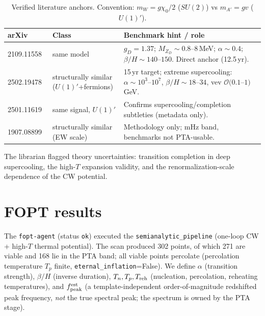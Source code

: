 \documentclass[11pt]{article}
\newcommand{\chizero}{\chi_0}
\begin{document}
\begin{table}[h]
\centering
\small
\begin{tabular}{@{}lp{4.0cm}p{6.4cm}@{}}
\toprule
arXiv & Class & Benchmark hint / role \\
\midrule
2109.11558~\cite{Borah2021} & same model & $g_D=1.37$; $M_{Z_D}\sim0.8$--$8$\,MeV; $\alpha\sim0.4$; $\beta/H\sim140$--$150$. Direct anchor (12.5\,yr). \\
2502.19478~\cite{Balan2025} & structurally similar ($U(1)'$+fermions) & 15\,yr target; extreme supercooling: $\alpha\sim10^3$--$10^7$, $\beta/H\sim18$--$34$, vev $\mathcal{O}(0.1$--$1)$\,GeV. \\
2501.11619~\cite{Goncalves2025} & same signal, $U(1)'$ & Confirms supercooling/completion subtleties (metadata only). \\
1907.08899~\cite{Mohamadnejad2020} & structurally similar (EW scale) & Methodology only; mHz band, benchmarks not PTA-usable. \\
\bottomrule
\end{tabular}
\caption{Verified literature anchors. Convention: $m_W=g\chizero/2$ ($SU(2)$) vs $m_{A'}=gv$
($U(1)'$).}
\label{tab:lit}
\end{table}

\noindent The librarian flagged theory uncertainties: transition completion in deep supercooling, the
high-$T$ expansion validity, and the renormalization-scale dependence of the CW potential.

\section{FOPT results}
\label{sec:fopt}
The \texttt{fopt-agent} (status \texttt{ok}) executed the \texttt{semianalytic\_pipeline} (one-loop CW +
high-$T$ thermal potential). The scan produced 302 points, of which 271 are viable and 168 lie in the
PTA band; all viable points percolate (percolation temperature $T_p$ finite,
\texttt{eternal\_inflation}=False). We define $\alpha$ (transition strength), $\beta/H$ (inverse
duration), $T_n,T_p,T_{\rm reh}$ (nucleation, percolation, reheating temperatures), and $f_{\rm
peak}^{\rm est}$ (a template-independent order-of-magnitude redshifted peak frequency, \emph{not} the
true spectral peak; the spectrum is owned by the PTA stage).
\end{document}

